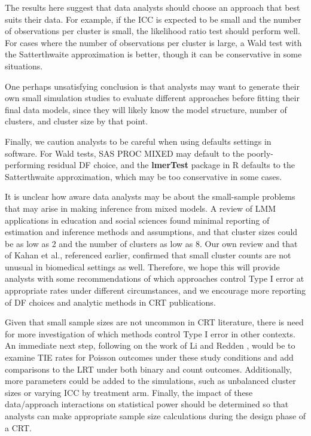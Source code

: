 \documentclass[twocolumn]{bmcart}%
\begin{document}
The results here suggest that data analysts should choose an approach that best suits their data. For example, if the ICC is expected to be small and the number of observations per cluster is small, the likelihood ratio test should perform well. For cases where the number of observations per cluster is large, a Wald test with the Satterthwaite approximation is better, though it can be conservative in some situations.

One perhaps unsatisfying conclusion is that analysts may want to generate their own small simulation studies to evaluate different approaches before fitting their final data models, since they will likely know the model structure, number of clusters, and cluster size by that point.

Finally, we caution analysts to be careful when using defaults settings in software. For Wald tests, SAS PROC MIXED may default to the poorly-performing residual DF choice, and the \textbf{lmerTest} package in R defaults to the Satterthwaite approximation, which may be too conservative in some cases.

It is unclear how aware data analysts may be about the small-sample problems that may arise in making inference from mixed models. A review of LMM applications in education and social sciences \cite{dedrick_multilevel_2009} found minimal reporting of estimation and inference methods and assumptions, and that cluster sizes could be as low as 2 and the number of clusters as low as 8. Our own review and that of Kahan et al., referenced earlier, confirmed that small cluster counts are not unusual in biomedical settings as well. Therefore, we hope this will provide analysts with some recommendations of which approaches control Type I error at appropriate rates under different circumstances, and we encourage more reporting of DF choices and analytic methods in CRT publications.

Given that small sample sizes are not uncommon in CRT literature, there is need for more investigation of which methods control Type I error in other contexts. An immediate next step, following on the work of Li and Redden \cite{li_comparing_2015}, would be to examine TIE rates for Poisson outcomes under these study conditions and add comparisons to the LRT under both binary and count outcomes. Additionally, more parameters could be added to the simulations, such as unbalanced cluster sizes or varying ICC by treatment arm. Finally, the impact of these data/approach interactions on statistical power should be determined so that analysts can make appropriate sample size calculations during the design phase of a CRT.
\end{document}
